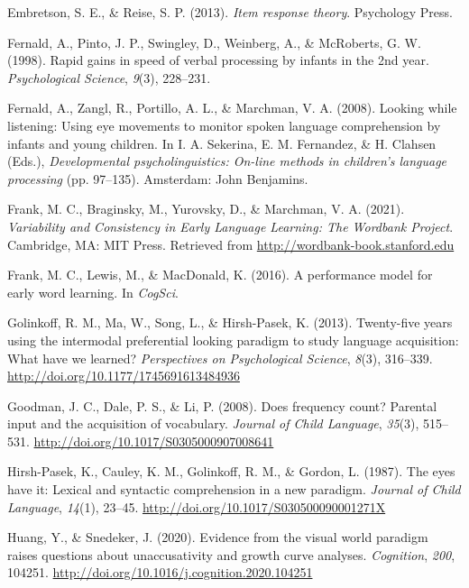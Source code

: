 \documentclass[10pt, letterpaper]{article}
\begin{document}
\leavevmode\hypertarget{ref-embretson2013}{}%
Embretson, S. E., \& Reise, S. P. (2013). \emph{Item response theory}.
Psychology Press.

\leavevmode\hypertarget{ref-fernald1998}{}%
Fernald, A., Pinto, J. P., Swingley, D., Weinberg, A., \& McRoberts, G.
W. (1998). Rapid gains in speed of verbal processing by infants in the
2nd year. \emph{Psychological Science}, \emph{9}(3), 228--231.

\leavevmode\hypertarget{ref-Fernald2008}{}%
Fernald, A., Zangl, R., Portillo, A. L., \& Marchman, V. A. (2008).
Looking while listening: Using eye movements to monitor spoken language
comprehension by infants and young children. In I. A. Sekerina, E. M.
Fernandez, \& H. Clahsen (Eds.), \emph{Developmental psycholinguistics:
On-line methods in children's language processing} (pp. 97--135).
Amsterdam: John Benjamins.

\leavevmode\hypertarget{ref-frank2021}{}%
Frank, M. C., Braginsky, M., Yurovsky, D., \& Marchman, V. A. (2021).
\emph{Variability and Consistency in Early Language Learning: The
Wordbank Project}. Cambridge, MA: MIT Press. Retrieved from
\url{http://wordbank-book.stanford.edu}

\leavevmode\hypertarget{ref-frank2016b}{}%
Frank, M. C., Lewis, M., \& MacDonald, K. (2016). A performance model
for early word learning. In \emph{CogSci}.

\leavevmode\hypertarget{ref-Golinkoff2013}{}%
Golinkoff, R. M., Ma, W., Song, L., \& Hirsh-Pasek, K. (2013).
Twenty-five years using the intermodal preferential looking paradigm to
study language acquisition: What have we learned? \emph{Perspectives on
Psychological Science}, \emph{8}(3), 316--339.
\url{http://doi.org/10.1177/1745691613484936}

\leavevmode\hypertarget{ref-Goodman2008}{}%
Goodman, J. C., Dale, P. S., \& Li, P. (2008). Does frequency count?
Parental input and the acquisition of vocabulary. \emph{Journal of Child
Language}, \emph{35}(3), 515--531.
\url{http://doi.org/10.1017/S0305000907008641}

\leavevmode\hypertarget{ref-Hirsh-Pasek1987}{}%
Hirsh-Pasek, K., Cauley, K. M., Golinkoff, R. M., \& Gordon, L. (1987).
The eyes have it: Lexical and syntactic comprehension in a new paradigm.
\emph{Journal of Child Language}, \emph{14}(1), 23--45.
\url{http://doi.org/10.1017/S030500090001271X}

\leavevmode\hypertarget{ref-Huang2020}{}%
Huang, Y., \& Snedeker, J. (2020). Evidence from the visual world
paradigm raises questions about unaccusativity and growth curve
analyses. \emph{Cognition}, \emph{200}, 104251.
\url{http://doi.org/10.1016/j.cognition.2020.104251}
\end{document}
